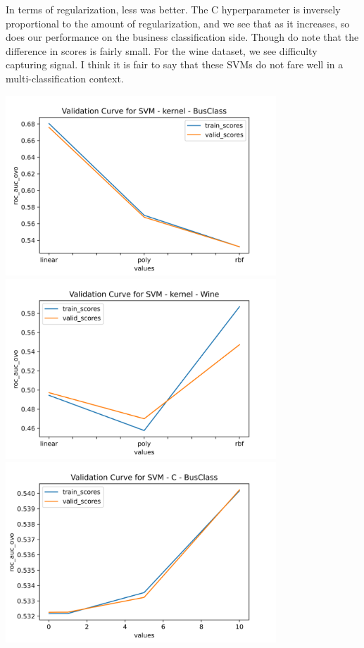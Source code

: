 \documentclass[
	letterpaper, %
]{jdf}
\begin{document}
In terms of regularization, less was better. The C hyperparameter is inversely proportional to the amount of regularization, and we see that as it increases, so does our performance on the business classification side. Though do note that the difference in scores is fairly small. For the wine dataset, we see difficulty capturing signal. I think it is fair to say that these SVMs do not fare well in a multi-classification context.

\includegraphics[width=4in]{Figures/BusClass-0920/SVM/val_curve_0.png}
\includegraphics[width=4in]{Figures/Wine-0921/SVM/val_curve_0.png}
\includegraphics[width=4in]{Figures/BusClass-0920/SVM/val_curve_1.png}
\end{document}
